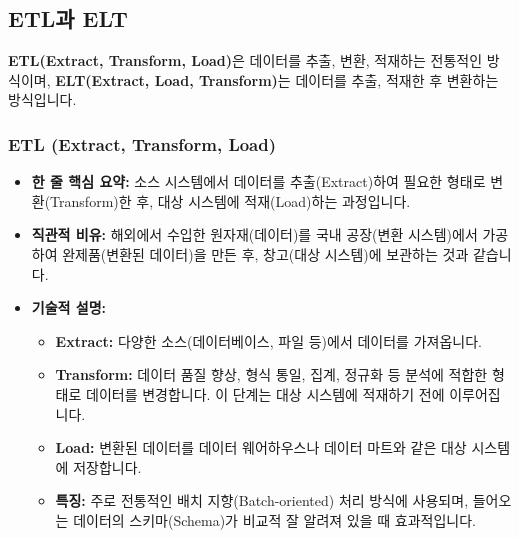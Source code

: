 \documentclass[11pt,a4paper]{article}
\theoremstyle{definition}
\begin{document}
\subsection{ETL과 ELT}

\begin{conceptbox}
\textbf{ETL(Extract, Transform, Load)}은 데이터를 추출, 변환, 적재하는 전통적인 방식이며,
\textbf{ELT(Extract, Load, Transform)}는 데이터를 추출, 적재한 후 변환하는 방식입니다.
\end{conceptbox}

\subsubsection{ETL (Extract, Transform, Load)}
\begin{itemize}
    \item \textbf{한 줄 핵심 요약:} 소스 시스템에서 데이터를 추출(Extract)하여 필요한 형태로 변환(Transform)한 후, 대상 시스템에 적재(Load)하는 과정입니다.
    \item \textbf{직관적 비유:} 해외에서 수입한 원자재(데이터)를 국내 공장(변환 시스템)에서 가공하여 완제품(변환된 데이터)을 만든 후, 창고(대상 시스템)에 보관하는 것과 같습니다.
    \item \textbf{기술적 설명:}
    \begin{itemize}
        \item \textbf{Extract:} 다양한 소스(데이터베이스, 파일 등)에서 데이터를 가져옵니다.
        \item \textbf{Transform:} 데이터 품질 향상, 형식 통일, 집계, 정규화 등 분석에 적합한 형태로 데이터를 변경합니다. 이 단계는 대상 시스템에 적재하기 전에 이루어집니다.
        \item \textbf{Load:} 변환된 데이터를 데이터 웨어하우스나 데이터 마트와 같은 대상 시스템에 저장합니다.
        \item \textbf{특징:} 주로 전통적인 배치 지향(Batch-oriented) 처리 방식에 사용되며, 들어오는 데이터의 스키마(Schema)가 비교적 잘 알려져 있을 때 효과적입니다.
    \end{itemize}
\end{itemize}
\end{document}
